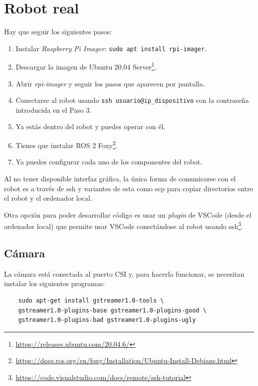 \section{Robot real}
\label{subsec:anexoconfig}

Hay que seguir los siguientes pasos: 

\begin{enumerate}
	\item Instalar \textit{Raspberry Pi Imager}: \verb|sudo apt install rpi-imager|.
	\item Descargar la imagen de Ubuntu 20.04 Server\footnote{\url{https://releases.ubuntu.com/20.04.6/}}.
	\item Abrir \textit{rpi-imager} y seguir los pasos que aparecen por pantalla.
	\item Conectarse al robot usando \verb|ssh usuario@ip_dispositivo| con la contraseña introducida en el Paso 3.
	\item Ya estás dentro del robot y puedes operar con él.
	\item Tienes que instalar ROS 2 Foxy\footnote{\url{https://docs.ros.org/en/foxy/Installation/Ubuntu-Install-Debians.html}}.
	\item Ya puedes configurar cada uno de los componentes del robot.
\end{enumerate}

Al no tener disponible interfaz gráfica, la única forma de comunicarse con el robot es a través de ssh y  variantes de esta como scp para copiar directorios entre el robot y el ordenador local.

Otra opción para poder desarrollar código es usar un \textit{plugin} de VSCode (desde el ordenador local) que permite usar VSCode conectándose al robot usando ssh\footnote{\url{https://code.visualstudio.com/docs/remote/ssh-tutorial}}.

\subsection{Cámara}
\label{subsec:anexocamara}

La cámara está conectada al puerto CSI y, para hacerla funcionar, se necesitan  instalar los siguientes programas: 

\begin{verbatim}
	sudo apt-get install gstreamer1.0-tools \ 
	gstreamer1.0-plugins-base gstreamer1.0-plugins-good \ 
	gstreamer1.0-plugins-bad gstreamer1.0-plugins-ugly
\end{verbatim}

